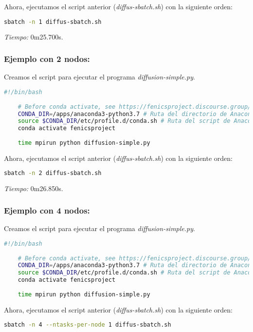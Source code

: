 Ahora, ejecutamos el script anterior (\textit{diffus-sbatch.sh}) con la siguiente orden:
\begin{lstlisting}[language=sh]
	sbatch -n 1 diffus-sbatch.sh
\end{lstlisting}

\textit{Tiempo:} 0m25.700s.

\subsubsection*{Ejemplo con 2 nodos:}
Creamos el script para ejecutar el programa \textit{diffusion-simple.py}.
\begin{lstlisting}[language=sh]
	#!/bin/bash
	
	# Before conda activate, see https://fenicsproject.discourse.group/t/fenics-from-conda-doesnt-import/3502/6
	CONDA_DIR=/apps/anaconda3-python3.7 # Ruta del directorio de Anaconda
	source $CONDA_DIR/etc/profile.d/conda.sh # Ruta del script de Anaconda
	conda activate fenicsproject
	
	time mpirun python diffusion-simple.py
\end{lstlisting}

Ahora, ejecutamos el script anterior (\textit{diffus-sbatch.sh}) con la siguiente orden:
\begin{lstlisting}[language=sh]
	sbatch -n 2 diffus-sbatch.sh
\end{lstlisting}

\textit{Tiempo:} 0m26.850s.

\subsubsection*{Ejemplo con 4 nodos:}
Creamos el script para ejecutar el programa \textit{diffusion-simple.py}.
\begin{lstlisting}[language=sh]
	#!/bin/bash
	
	# Before conda activate, see https://fenicsproject.discourse.group/t/fenics-from-conda-doesnt-import/3502/6
	CONDA_DIR=/apps/anaconda3-python3.7 # Ruta del directorio de Anaconda
	source $CONDA_DIR/etc/profile.d/conda.sh # Ruta del script de Anaconda
	conda activate fenicsproject
	
	time mpirun python diffusion-simple.py
\end{lstlisting}

Ahora, ejecutamos el script anterior (\textit{diffus-sbatch.sh}) con la siguiente orden:
\begin{lstlisting}[language=sh]
	sbatch -n 4 --ntasks-per-node 1 diffus-sbatch.sh
\end{lstlisting}

